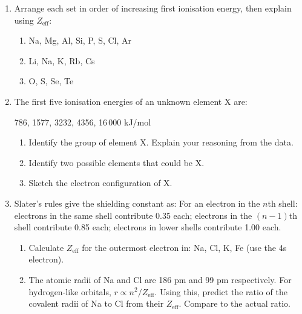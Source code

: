 \documentclass[12pt, a4paper]{book}
\begin{document}
\begin{problembox}
\begin{enumerate}[label=\textbf{\arabic*.}]
  \item Arrange each set in order of increasing first
        ionisation energy, then explain using $Z_\text{eff}$:
        \begin{enumerate}[label=(\alph*)]
          \item Na, Mg, Al, Si, P, S, Cl, Ar
          \item Li, Na, K, Rb, Cs
          \item O, S, Se, Te
        \end{enumerate}

  \item The first five ionisation energies of an unknown
        element X are:
        \begin{center}
        786, 1577, 3232, 4356, 16\,000 kJ/mol
        \end{center}
        \begin{enumerate}[label=(\alph*)]
          \item Identify the group of element X.
                Explain your reasoning from the data.
          \item Identify two possible elements that could be X.
          \item Sketch the electron configuration of X.
        \end{enumerate}

  \item Slater's rules give the shielding constant as:
        For an electron in the $n$th shell:
        electrons in the same shell contribute 0.35 each;
        electrons in the $(n-1)$th shell contribute 0.85 each;
        electrons in lower shells contribute 1.00 each.
        \begin{enumerate}[label=(\alph*)]
          \item Calculate $Z_\text{eff}$ for the outermost
                electron in: Na, Cl, K, Fe (use the 4s electron).
          \item The atomic radii of Na and Cl are 186 pm
                and 99 pm respectively.
                For hydrogen-like orbitals, $r \propto n^2/Z_\text{eff}$.
                Using this, predict the ratio of the
                covalent radii of Na to Cl from their $Z_\text{eff}$.
                Compare to the actual ratio.
        \end{enumerate}
\end{enumerate}
\end{problembox}
\end{document}
